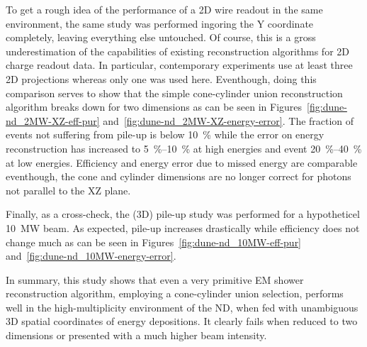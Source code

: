 To get a rough idea of the performance of a 2D wire readout in the same environment, the same study was performed ingoring the Y coordinate completely, leaving everything else untouched.
Of course, this is a gross underestimation of the capabilities of existing reconstruction algorithms for 2D charge readout data.
In particular, contemporary experiments use at least three 2D projections whereas only one was used here.
Eventhough, doing this comparison serves to show that the simple cone-cylinder union reconstruction algorithm breaks down for two dimensions as can be seen in Figures~\ref{fig:dune-nd_2MW-XZ-eff-pur} and~\ref{fig:dune-nd_2MW-XZ-energy-error}.
The fraction of events not suffering from pile-up is below \SI{10}{\percent} while the error on energy reconstruction has increased to \SIrange{5}{10}{\percent} at high energies and event \SIrange{20}{40}{\percent} at low energies.
Efficiency and energy error due to missed energy are comparable eventhough, the cone and cylinder dimensions are no longer correct for photons not parallel to the XZ plane.

Finally, as a cross-check, the (3D) pile-up study was performed for a hypotheticel \SI{10}{\mega\watt} beam.
As expected, pile-up increases drastically while efficiency does not change much as can be seen in Figures~\ref{fig:dune-nd_10MW-eff-pur} and~\ref{fig:dune-nd_10MW-energy-error}.

In summary, this study shows that even a very primitive EM shower reconstruction algorithm, employing a cone-cylinder union selection, performs well in the high-multiplicity environment of the \dune{} ND, when fed with unambiguous 3D spatial coordinates of energy depositions.
It clearly fails when reduced to two dimensions or presented with a much higher beam intensity.